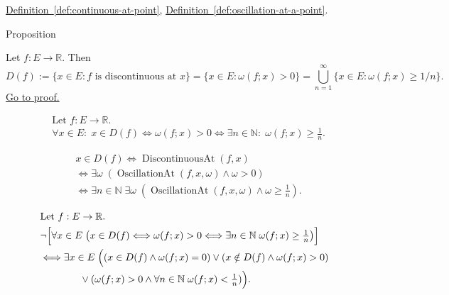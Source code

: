 \begin{remark*}[Dependencies]
\hyperref[def:continuous-at-point]{Definition~\ref*{def:continuous-at-point}},
\hyperref[def:oscillation-at-a-point]{Definition~\ref*{def:oscillation-at-a-point}}.
\end{remark*}


\begin{propositionbox}{Proposition}
\begin{proposition}
\label{prop:discontinuity-set-via-oscillation}
Let $f:E\to\mathbb{R}$. Then
\[
D(f):=\{x\in E: f \text{ is discontinuous at } x\}
=\{x\in E: \omega(f;x)>0\}
=\bigcup_{n=1}^{\infty} \{x\in E: \omega(f;x)\ge 1/n\}.
\]
\hyperref[prf:discontinuity-set-via-oscillation]{Go to proof.}
\end{proposition}
\end{propositionbox}

\begin{remark*}
\[
\begin{aligned}
&\text{Let } f:E\to\mathbb{R}.\\
&\forall x\in E:\;
x\in D(f)
\Longleftrightarrow \omega(f;x)>0
\Longleftrightarrow
\exists n\in\mathbb{N}:\; \omega(f;x)\ge \tfrac1n.
\end{aligned}
\]
\end{remark*}

\begin{remark*}
\[
\begin{aligned}
&x\in D(f)
\Longleftrightarrow
\operatorname{DiscontinuousAt}(f,x)\\
&\Longleftrightarrow
\exists \omega\;(\operatorname{OscillationAt}(f,x,\omega)\land \omega>0)\\
&\Longleftrightarrow
\exists n\in\mathbb{N}\;\exists \omega\;(\operatorname{OscillationAt}(f,x,\omega)\land \omega\ge \tfrac1n).
\end{aligned}
\]
\end{remark*}

\begin{remark*}
\[
\begin{aligned}
&\text{Let } f:E\to\mathbb{R}.\\
&\neg\Bigl[\forall x\in E\;\bigl(x\in D(f)\Longleftrightarrow \omega(f;x)>0 \Longleftrightarrow \exists n\in\mathbb{N}\; \omega(f;x)\ge \tfrac1n\bigr)\Bigr]\\
&\Longleftrightarrow \exists x\in E\;\Bigl((x\in D(f)\land \omega(f;x)=0)\lor(x\notin D(f)\land \omega(f;x)>0)\\
&\qquad\qquad\lor(\omega(f;x)>0\land \forall n\in\mathbb{N}\; \omega(f;x)<\tfrac1n)\Bigr).
\end{aligned}
\]
\end{remark*}

